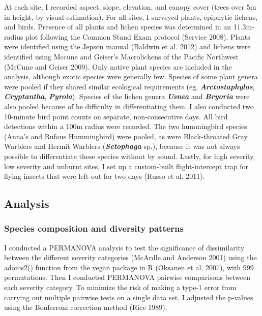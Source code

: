 \documentclass[]{article}
\begin{document}
At each site, I recorded aspect, slope, elevation, and canopy cover
(trees over 5m in height, by visual estimation). For all sites, I
surveyed plants, epiphytic lichens, and birds. Presence of all plants
and lichen species was determined in an 11.3m-radius plot following the
Common Stand Exam protocol (Service 2008). Plants were identified using
the Jepson manual (Baldwin et al. 2012) and lichens were identified
using Mccune and Geiser's Macrolichens of the Pacific Northwest (McCune
and Geiser 2009). Only native plant species are included in the
analysis, although exotic species were generally few. Species of some
plant genera were pooled if they shared similar ecological requirements
(eg. \textbf{\emph{Arctostaphylos}}, \textbf{\emph{Cryptantha}},
\textbf{\emph{Pyrola}}). Species of the lichen genera
\textbf{\emph{Usnea}} and \textbf{\emph{Bryoria}} were also pooled
because of he difficulty in differentiating them. I also conducted two
10-minute bird point counts on separate, non-consecutive days. All bird
detections within a 100m radius were recorded. The two hummingbird
species (Anna's and Rufous Hummingbird) were pooled, as were
Black-throated Gray Warblers and Hermit Warblers
(\textbf{\emph{Setophaga}} sp.), because it was not always possible to
differentiate these species without by sound. Lastly, for high severity,
low severity and unburnt sites, I set up a custom-built flight-intercept
trap for flying insects that were left out for two days (Russo et al.
2011).

\hypertarget{analysis}{%
\subsection{Analysis}\label{analysis}}

\hypertarget{species-composition-and-diversity-patterns}{%
\subsubsection{Species composition and diversity
patterns}\label{species-composition-and-diversity-patterns}}

I conducted a PERMANOVA analysis to test the significance of
dissimilarity between the different severity categories (McArdle and
Anderson 2001) using the adonis2() function from the vegan package in R
(Oksanen et al. 2007), with 999 permutations. Then I conducted PERMANOVA
pairwise comparisons between each severity category. To minimize the
risk of making a type-1 error from carrying out multiple pairwise tests
on a single data set, I adjusted the p-values using the Bonferroni
correction method (Rice 1989).
\end{document}
